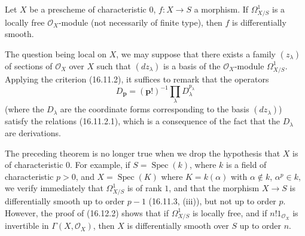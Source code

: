 \begin{theorem}[16.12.2]
\label{IV.16.12.2}
Let $X$ be a prescheme of characteristic $0$, $f:X\to S$ a morphism. If
$\Omega_{X/S}^1$ is a locally free $\mathcal{O}_X$-module (not
necessarily of finite type), then $f$ is differentially smooth.
\end{theorem}

The question being local on $X$, we may suppose that there exists a family
$(z_\lambda)$ of sections of $\mathcal{O}_X$ over $X$ such that
$(dz_\lambda)$ is a basis of the $\mathcal{O}_X$-module $\Omega_{X/S}^1$.
Applying the criterion (16.11.2), it suffices to remark that the operators
\[
  D_{\mathbf{p}}=(\mathbf{p}!)^{-1}
  \prod_\lambda D_\lambda^{p_\lambda}
\]
(where the $D_\lambda$ are the coordinate forms corresponding to the basis
$(dz_\lambda)$) satisfy the relations (16.11.2.1), which is a
consequence of the fact that the $D_\lambda$ are derivations.

\begin{env}[16.12.3]
\label{IV.16.12.3}
The preceding theorem is no longer true when we drop the hypothesis that
$X$ is of characteristic $0$. For example, if
$S=\operatorname{Spec}(k)$, where $k$ is a field of characteristic $p>0$,
and $X=\operatorname{Spec}(K)$ where $K=k(\alpha)$ with
$\alpha\notin k$, $\alpha^p\in k$, we verify immediately
that $\Omega_{X/S}^1$ is of rank $1$, and that the morphism $X\to S$ is
differentially smooth up to order $p-1$ (16.11.3, (iii)), but not
up to order $p$. However, the proof of (16.12.2) shows that if
$\Omega_{X/S}^1$ is locally free, and if $n!1_{\mathcal{O}_X}$ is
invertible in $\Gamma(X,\mathcal{O}_X)$, then $X$ is differentially
smooth over $S$ up to order $n$.
\end{env}

